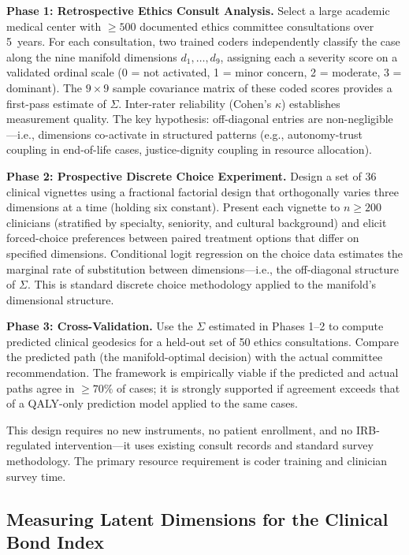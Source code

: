\documentclass[12pt]{article}
\theoremstyle{definition}
\theoremstyle{remark}
\begin{document}
\textbf{Phase 1: Retrospective Ethics Consult Analysis.}  Select a large academic medical center with $\geq 500$ documented ethics committee consultations over 5~years.  For each consultation, two trained coders independently classify the case along the nine manifold dimensions $d_1, \ldots, d_9$, assigning each a severity score on a validated ordinal scale (0 = not activated, 1 = minor concern, 2 = moderate, 3 = dominant).  The $9 \times 9$ sample covariance matrix of these coded scores provides a first-pass estimate of $\Sigma$.  Inter-rater reliability (Cohen's $\kappa$) establishes measurement quality.  The key hypothesis: off-diagonal entries are non-negligible---i.e., dimensions co-activate in structured patterns (e.g., autonomy-trust coupling in end-of-life cases, justice-dignity coupling in resource allocation).

\textbf{Phase 2: Prospective Discrete Choice Experiment.}  Design a set of 36 clinical vignettes using a fractional factorial design that orthogonally varies three dimensions at a time (holding six constant).  Present each vignette to $n \geq 200$ clinicians (stratified by specialty, seniority, and cultural background) and elicit forced-choice preferences between paired treatment options that differ on specified dimensions.  Conditional logit regression on the choice data estimates the marginal rate of substitution between dimensions---i.e., the off-diagonal structure of $\Sigma$.  This is standard discrete choice methodology \cite{drummond2015} applied to the manifold's dimensional structure.

\textbf{Phase 3: Cross-Validation.}  Use the $\Sigma$ estimated in Phases 1--2 to compute predicted clinical geodesics for a held-out set of 50 ethics consultations.  Compare the predicted path (the manifold-optimal decision) with the actual committee recommendation.  The framework is empirically viable if the predicted and actual paths agree in $\geq 70\%$ of cases; it is strongly supported if agreement exceeds that of a QALY-only prediction model applied to the same cases.

This design requires no new instruments, no patient enrollment, and no IRB-regulated intervention---it uses existing consult records and standard survey methodology.  The primary resource requirement is coder training and clinician survey time.

\subsection{Measuring Latent Dimensions for the Clinical Bond Index}
\label{sec:dimension_measurement}
\end{document}
